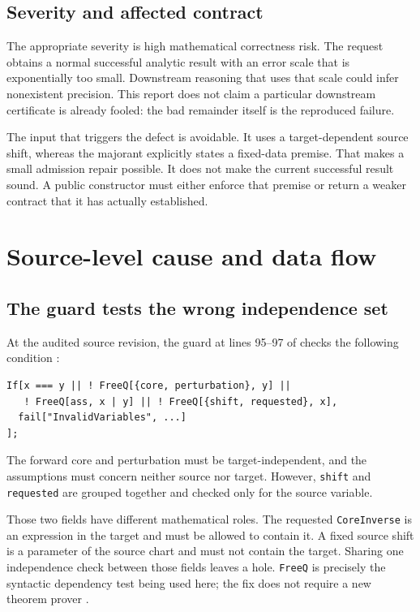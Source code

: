 \documentclass[11pt,letterpaper]{article}
\newcommand{\code}[1]{\texttt{#1}}
\newcommand{\source}[1]{\path{#1}}
\begin{document}
\subsection{Severity and affected contract}
The appropriate severity is high mathematical correctness risk. The request obtains a normal successful analytic result with an error scale that is exponentially too small. Downstream reasoning that uses that scale could infer nonexistent precision. This report does not claim a particular downstream certificate is already fooled: the bad remainder itself is the reproduced failure.

The input that triggers the defect is avoidable. It uses a target-dependent source shift, whereas the majorant explicitly states a fixed-data premise. That makes a small admission repair possible. It does not make the current successful result sound. A public constructor must either enforce that premise or return a weaker contract that it has actually established.

\section{Source-level cause and data flow}
\subsection{The guard tests the wrong independence set}
At the audited source revision, the guard at lines 95--97 of \source{ExponentialCorePerturbation.wl} checks the following condition \cite{expcore}:
\begin{lstlisting}
If[x === y || ! FreeQ[{core, perturbation}, y] ||
   ! FreeQ[ass, x | y] || ! FreeQ[{shift, requested}, x],
  fail["InvalidVariables", ...]
];
\end{lstlisting}
The forward core and perturbation must be target-independent, and the assumptions must concern neither source nor target. However, \code{shift} and \code{requested} are grouped together and checked only for the source variable.

Those two fields have different mathematical roles. The requested \code{CoreInverse} is an expression in the target and must be allowed to contain it. A fixed source shift is a parameter of the source chart and must not contain the target. Sharing one independence check between those fields leaves a hole. \code{FreeQ} is precisely the syntactic dependency test being used here; the fix does not require a new theorem prover \cite{freeq}.
\end{document}
